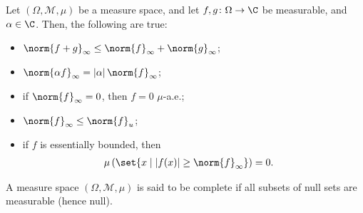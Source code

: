 \begin{fact}
  Let $\left(\Omega,\mathcal{M},\mu\right)$ be a measure space, and let $f,g\colon \Omega\rightarrow \C$ be measurable, and $\alpha \in \C$. Then, the following are true:
  \begin{itemize}
    \item $\displaystyle \norm{f+g}_{\infty}\leq \norm{f}_{\infty} + \norm{g}_{\infty}$;
    \item $\displaystyle \norm{\alpha f}_{\infty} = \left\vert \alpha \right\vert\norm{f}_{\infty}$;
    \item if $\displaystyle \norm{f}_{\infty} = 0$, then $f = 0$ $\mu$-a.e.;
    \item $\displaystyle \norm{f}_{\infty}\leq \norm{f}_{u}$;
    \item if $f$ is essentially bounded, then
      \begin{align*}
        \mu\left(\set{x\mid \left\vert f(x) \right\vert\geq \norm{f}_{\infty}}\right) &= 0.
      \end{align*}
  \end{itemize}
\end{fact}

\begin{definition}
A measure space $\left(\Omega,\mathcal{M},\mu\right)$ is said to be complete if all subsets of null sets are measurable (hence null).
\end{definition}
